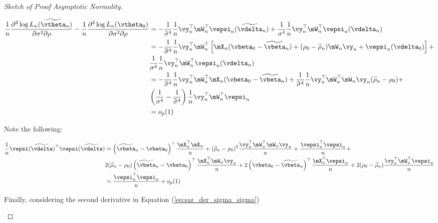 \documentclass[english,12pt]{book}\usepackage[]{graphicx}\usepackage[]{xcolor}
\begin{document}
\begin{proof}[Sketch of Proof Asymptotic Normality]
\begin{enumerate}
   
    \begin{equation*}
    \begin{aligned}
    \frac{1}{n}\frac{\partial^2 \log L_n(\widetilde{\vtheta}_n)}{\partial \sigma^2 \partial \rho} - \frac{1}{n}\frac{\partial^2 \log L_n(\vtheta_0)}{\partial \sigma^2 \partial \rho}& = -\frac{1}{\widetilde{\sigma}^4}\frac{1}{n}\vy_n^\top\mW_n^\top\vepsi_n(\widetilde{\vdelta}_n) + \frac{1}{\sigma^4}\frac{1}{n}\vy_n^\top\mW_n^\top\vepsi_n(\vdelta_n)\\
    & = -\frac{1}{\widetilde{\sigma}^4}\frac{1}{n}\vy_n^\top\mW_n^\top\left[\mX_n(\vbeta_0 - \widetilde{\vbeta}_n) + (\rho_0 - \widetilde{\rho}_n)\mW_n\vy_n + \vepsi_n(\vdelta_0)\right] + \\
    &  \frac{1}{\sigma^4}\frac{1}{n}\vy_n^\top\mW_n^\top\vepsi_n(\vdelta_n) \\
    &= -\frac{1}{\widetilde{\sigma}^4}\frac{1}{n}\vy_n^\top\mW_n^\top\mX_n(\vbeta_0 - \widetilde{\vbeta}_n)  + \frac{1}{\widetilde{\sigma}^4}\frac{1}{n}\vy_n^\top\mW_n^\top\mW_n\vy_n(\widetilde{\rho}_n-\rho_0) + \\
    & \left(\frac{1}{\sigma^4}-\frac{1}{\widetilde{\sigma}^4}\right)\frac{1}{n}\vy_n^\top\mW_n^\top\vepsi_{n} \\
    & = o_p(1)
    \end{aligned}
   \end{equation*}
   
    Note the following:
   
   \begin{equation*}
    \begin{aligned}
    \frac{1}{n}\vepsi(\widetilde{\vdelta})^\top \vepsi(\widetilde{\vdelta}) & = \left(\widetilde{\vbeta}_n - \vbeta_0\right)^\top\frac{\mX_n^\top\mX_n}{n} + (\widetilde{\rho}_n -\rho_0)^2\frac{\vy_n^\top\mW_n^\top\mW_n\vy_n}{n} + \frac{\vepsi_n^{\top}\vepsi_n}{n} + \\
    & 2(\widetilde{\rho}_n -\rho_0)\left(\widetilde{\vbeta}_n - \vbeta_0\right)^\top\frac{\mX_n^\top\mW_n\vy_n}{n} + 2\left(\vbeta_0-\widetilde{\vbeta}_n\right)^\top\frac{\mX_n^\top\vepsi_n}{n} + 2(\rho_0-\widetilde{\rho}_n)\frac{\vy_n^\top\mW_n^\top\vepsi_n}{n} \\
    & = \frac{\vepsi_n^{\top}\vepsi_n}{n} + o_p(1)
    \end{aligned}
   \end{equation*}
   
   
   Finally, considering the second derivative in Equation (\ref{eq:sar_der_sigma_sigma})
   

\end{enumerate}
\end{proof}
\end{document}
